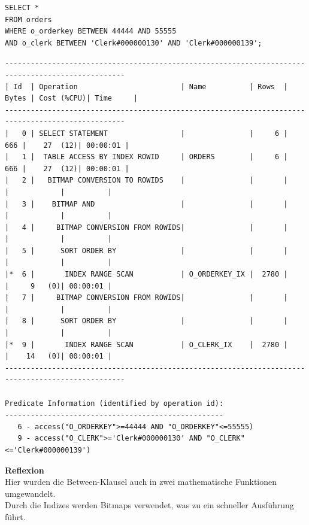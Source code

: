 \documentclass[10pt]{article}
\begin{document}
\begin{lstlisting}[style=sql]
SELECT *
FROM orders
WHERE o_orderkey BETWEEN 44444 AND 55555
AND o_clerk BETWEEN 'Clerk#000000130' AND 'Clerk#000000139';
\end{lstlisting}
\begin{lstlisting}[style=queryexecutionplanSmall]
--------------------------------------------------------------------------------------------------
| Id  | Operation                        | Name          | Rows  | Bytes | Cost (%CPU)| Time     |
--------------------------------------------------------------------------------------------------
|   0 | SELECT STATEMENT                 |               |     6 |   666 |    27  (12)| 00:00:01 |
|   1 |  TABLE ACCESS BY INDEX ROWID     | ORDERS        |     6 |   666 |    27  (12)| 00:00:01 |
|   2 |   BITMAP CONVERSION TO ROWIDS    |               |       |       |            |          |
|   3 |    BITMAP AND                    |               |       |       |            |          |
|   4 |     BITMAP CONVERSION FROM ROWIDS|               |       |       |            |          |
|   5 |      SORT ORDER BY               |               |       |       |            |          |
|*  6 |       INDEX RANGE SCAN           | O_ORDERKEY_IX |  2780 |       |     9   (0)| 00:00:01 |
|   7 |     BITMAP CONVERSION FROM ROWIDS|               |       |       |            |          |
|   8 |      SORT ORDER BY               |               |       |       |            |          |
|*  9 |       INDEX RANGE SCAN           | O_CLERK_IX    |  2780 |       |    14   (0)| 00:00:01 |
--------------------------------------------------------------------------------------------------
 
Predicate Information (identified by operation id):
---------------------------------------------------
   6 - access("O_ORDERKEY">=44444 AND "O_ORDERKEY"<=55555)
   9 - access("O_CLERK">='Clerk#000000130' AND "O_CLERK"<='Clerk#000000139')
\end{lstlisting}
\textbf{Reflexion} \\
Hier wurden die Between-Klausel auch in zwei mathematische Funktionen umgewandelt.\\
Durch die Indizes werden Bitmaps verwendet, was zu ein schneller Ausführung führt.
\newpage
\end{document}
